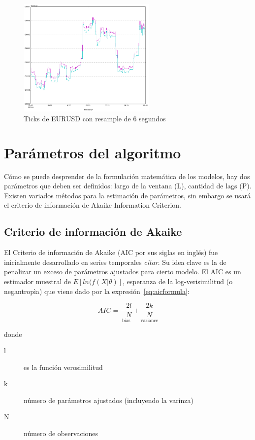 \begin{figure}[h!t]
    \begin{center}
        \includegraphics[width=0.6\textwidth]{images/eurusd_6s}
        \caption{Ticks de EURUSD con resample de 6 segundos}
        \label{fig:eurusd_r6s}
    \end{center}
\end{figure}

\newpage
\section{Parámetros del algoritmo}
Cómo se puede desprender de la formulación matemática de los modelos, hay dos
parámetros que deben ser definidos: largo de la ventana (L), cantidad de lags
(P). Existen variados métodos para la estimación de parámetros, sin embargo se
usará el criterio de información de Akaike Information Criterion.

\subsection{Criterio de información de Akaike}
El Criterio de información de Akaike (AIC por sus siglas en inglés) fue
inicialmente desarrollado en series temporales \emph{citar}. Su idea clave es
la de penalizar un exceso de parámetros ajustados para cierto modelo. El AIC es
un estimador muestral de $E[ln(f(X|\theta)]$, esperanza de la log-verisimilitud
(o negantropìa) que viene dado por la expresión~\ref{eq:aicformula}:

\begin{equation}
\label{eq:aicformula}
AIC = \underset{\text{bias}}{-\frac{2l}{N}} + 
\underset{\text{variance}}{\frac{2k}{N}}
\end{equation}

\noindent donde

\begin{description}
\item[l] es la función verosimilitud
\item[k] número de parámetros ajustados (incluyendo la varinza)
\item[N] número de observaciones
\end{description}

